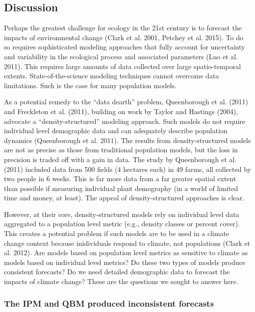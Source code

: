 \documentclass[12pt,]{article}
\begin{document}
\subsection{Discussion}\label{discussion}

Perhaps the greatest challenge for ecology in the 21st century is to
forecast the impacts of environmental change (Clark et al. 2001, Petchey
et al. 2015). To do so requires sophisticated modeling approaches that
fully account for uncertainty and variability in the ecological process
and associated parameters (Luo et al. 2011). This requires large amounts
of data collected over large spatio-temporal extents.
State-of-the-science modeling techniques cannot overcome data
limitations. Such is the case for many population models.

As a potential remedy to the ``data dearth'' problem, Queenborough et
al. (2011) and Freckleton et al. (2011), building on work by Taylor and
Hastings (2004), advocate a ``density-structured'' modeling approach.
Such models do not require individual level demographic data and can
adequately describe population dynamics (Queenborough et al. 2011). The
results from density-structured models are not as precise as those from
traditional population models, but the loss in precision is traded off
with a gain in data. The study by Queenborough et al. (2011) included
data from 500 fields (4 hectares each) in 49 farms, all collected by two
people in 6 weeks. This is far more data from a far greater spatial
extent than possible if measuring individual plant demography (in a
world of limited time and money, at least). The appeal of
density-structured approaches is clear.

However, at their core, density-structured models rely on individual
level data aggregated to a population level metric (e.g., density
classes or percent cover). This creates a potential problem if such
models are to be used in a climate change context because inidividuals
respond to climate, not populations (Clark et al. 2012). Are models
based on population level metrics as sensitive to climate as models
based on individual level metrics? Do these two types of models produce
consistent forecasts? Do we need detailed demographic data to forecast
the impacts of climate change? These are the questions we sought to
answer here.

\subsubsection{The IPM and QBM produced inconsistent
forecasts}\label{the-ipm-and-qbm-produced-inconsistent-forecasts}
\end{document}
